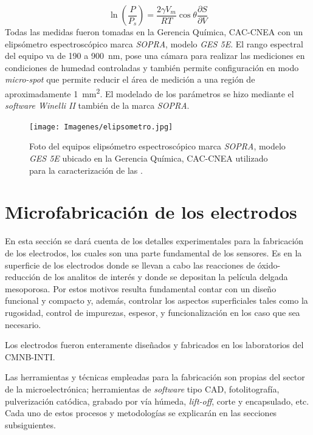 			\begin{equation}
			  	 \ln \left(\frac{P}{P_s}\right)=\frac{2\gamma V_m}{RT} \cos{\theta}\frac{\partial S}{\partial V}
			     \label{eq:kelvin}
			 	 \end{equation}					
		Todas las medidas fueron tomadas en la Gerencia Química, CAC-CNEA con un elipsómetro espectroscópico marca \textit{SOPRA}, modelo \textit{GES 5E}. El rango espectral del equipo va de 190 a \SI{900}{\nm}, pose una cámara para realizar las mediciones en condiciones de humedad controladas y también permite configuración en modo \textit{micro-spot} que permite reducir el área de medición a una región de aproximadamente \SI{1}{\mm^2}. El modelado de los parámetros se hizo mediante el \textit{software Winelli II} también de la marca \textit{SOPRA}.
					\begin{figure}[ht]
							  \begin{center}
							  \texttt{[image: Imagenes/elipsometro.jpg]}
							  \caption[Elipsómetro]{Foto del equipos elipsómetro espectroscópico marca \textit{SOPRA}, modelo \textit{GES 5E} ubicado en la Gerencia Química, CAC-CNEA utilizado para la caracterización de las \pdm.}
							  \label{fig:elipsofoto}
							  \end{center}
							  \end{figure}

\section{Microfabricación de los electrodos}
		
	 En esta sección se dará cuenta de los detalles experimentales para la fabricación de los electrodos, los cuales son una parte fundamental de los sensores. Es en la superficie de los electrodos donde se llevan a cabo las reacciones de óxido-reducción de los analitos de interés y donde se depositan la película delgada mesoporosa. Por estos motivos resulta fundamental contar con un diseño funcional y compacto y, además, controlar los aspectos superficiales tales como la rugosidad, control de impurezas, espesor, y funcionalización en los caso que sea necesario.

	 Los electrodos fueron enteramente diseñados y fabricados en los laboratorios del CMNB-INTI. 
		
	 Las herramientas y técnicas empleadas para la fabricación son propias del sector de la microelectrónica; herramientas de \textit{software} tipo CAD, fotolitografía, pulverización catódica, grabado por vía húmeda, \textit{lift-off}, corte y encapsulado, etc.\cite{Franssila2004,Jaeger2001} Cada uno de estos procesos y metodologías se explicarán en las secciones subsiguientes. 

